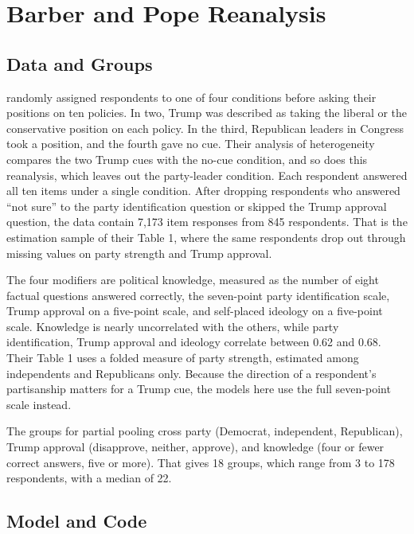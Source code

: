 \documentclass[12pt]{article}
\begin{document}
\newpage

\section{Barber and Pope Reanalysis}

\subsection{Data and Groups}

\citet{BarberPope2019} randomly assigned respondents to one of four conditions before asking their positions on ten policies.
In two, Trump was described as taking the liberal or the conservative position on each policy. In the third, Republican leaders in Congress took a position, and the fourth gave no cue.
Their analysis of heterogeneity compares the two Trump cues with the no-cue condition, and so does this reanalysis, which leaves out the party-leader condition.
Each respondent answered all ten items under a single condition.
After dropping respondents who answered ``not sure'' to the party identification question or skipped the Trump approval question, the data contain 7,173 item responses from 845 respondents.
That is the estimation sample of their Table 1, where the same respondents drop out through missing values on party strength and Trump approval.

The four modifiers are political knowledge, measured as the number of eight factual questions answered correctly, the seven-point party identification scale, Trump approval on a five-point scale, and self-placed ideology on a five-point scale.
Knowledge is nearly uncorrelated with the others, while party identification, Trump approval and ideology correlate between 0.62 and 0.68.
Their Table 1 uses a folded measure of party strength, estimated among independents and Republicans only.
Because the direction of a respondent's partisanship matters for a Trump cue, the models here use the full seven-point scale instead.

The groups for partial pooling cross party (Democrat, independent, Republican), Trump approval (disapprove, neither, approve), and knowledge (four or fewer correct answers, five or more).
That gives 18 groups, which range from 3 to 178 respondents, with a median of 22.

\subsection{Model and Code}
\end{document}

